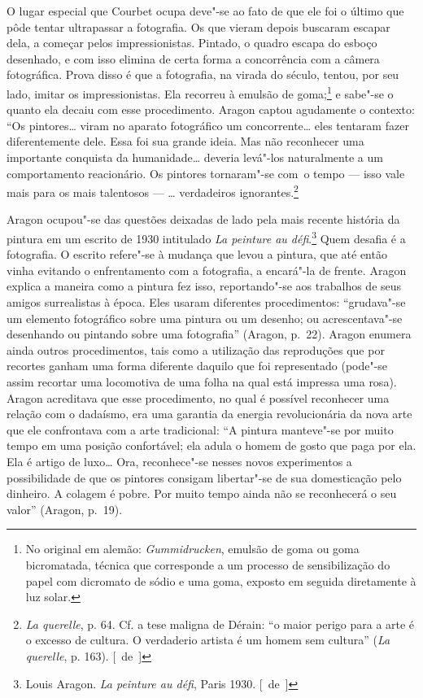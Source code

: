 O lugar especial que Courbet ocupa deve"-se ao fato de que ele foi o
último que pôde tentar ultrapassar a fotografia. Os que vieram depois buscaram
escapar dela, a começar pelos impressionistas. Pintado, o quadro escapa
do esboço desenhado, e com isso elimina de certa forma a
concorrência com a câmera fotográfica. Prova disso é que a fotografia, na
virada do século, tentou, por seu lado, imitar os impressionistas. Ela
recorreu à emulsão de goma;\footnote{No original em alemão:
  \emph{Gummidrucken}, emulsão de goma ou goma bicromatada, técnica que
  corresponde a um processo de sensibilização do papel com dicromato de
  sódio e uma goma, exposto em seguida diretamente à luz solar. \versal{[N.~T.]}} e
sabe"-se o quanto ela decaiu com esse procedimento. Aragon captou
agudamente o contexto: ``Os pintores\ldots{} viram no aparato fotográfico um
concorrente\ldots{} eles tentaram fazer diferentemente dele. Essa foi sua
grande ideia. Mas não reconhecer uma importante conquista da humanidade\ldots{} deveria levá"-los naturalmente a um comportamento reacionário. Os
pintores tornaram"-se com~o tempo --- isso vale mais para os mais
talentosos --- \ldots{} verdadeiros ignorantes.\footnote{\emph{La querelle}, p.
  64. Cf. a tese maligna de Dérain: ``o maior perigo para a arte é o
  excesso de cultura. O verdaderio artista é um homem sem cultura''
  (\emph{La querelle}, p. 163). [~de~]}

Aragon ocupou"-se das questões deixadas de lado pela mais recente história da
pintura em um escrito de 1930 intitulado \emph{La peinture au
défi}.\footnote{Louis Aragon. \emph{La peinture au défi}, Paris 1930. [~de~]}
Quem desafia é a fotografia. O escrito refere"-se à mudança que levou a
pintura, que até então vinha evitando o enfrentamento com a fotografia, a
encará"-la de frente. Aragon explica a maneira como a pintura fez isso,
reportando"-se aos trabalhos de seus amigos surrealistas à época. Eles usaram
diferentes procedimentos: ``grudava"-se um elemento fotográfico sobre uma
pintura ou um desenho; ou acrescentava"-se desenhando ou pintando sobre uma
fotografia'' (Aragon, p.~22). Aragon enumera ainda outros
procedimentos, tais como a utilização das reproduções que por recortes
ganham uma forma diferente daquilo que foi representado (pode"-se assim
recortar uma locomotiva de uma folha na qual está impressa uma rosa).
Aragon acreditava que esse procedimento, no qual é possível reconhecer uma
relação com o dadaísmo, era uma garantia da energia revolucionária
da nova arte que ele confrontava com a arte tradicional: ``A pintura
manteve"-se por muito tempo em uma posição confortável; ela adula o homem de gosto
que paga por ela. Ela é artigo de luxo\ldots{} Ora,
reconhece"-se nesses novos experimentos a possibilidade de que os pintores
consigam libertar"-se de sua domesticação pelo dinheiro. A
colagem é pobre. Por muito tempo ainda não se reconhecerá o seu valor'' (Aragon, p.~19).

